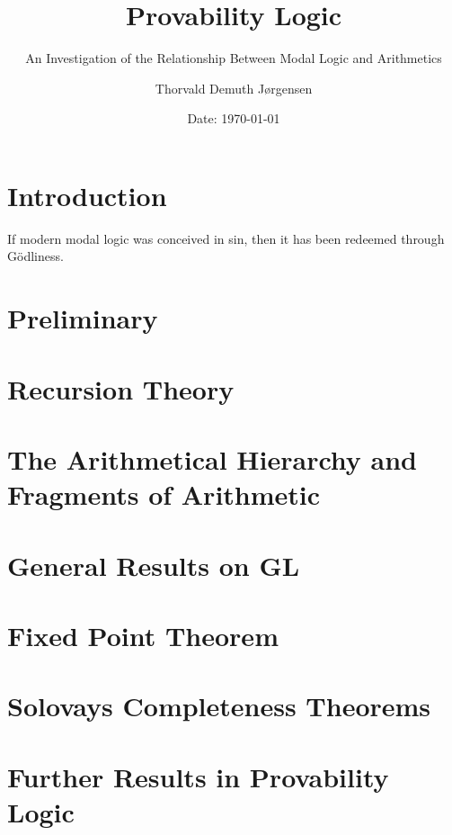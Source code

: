 \documentclass[12pt,a4paper,dvipsnames,bibliography=totocnumbered]{scrbook}
\author{Thorvald Demuth Jørgensen}
\title{Provability Logic}
\subtitle{An Investigation of the Relationship Between Modal Logic and
Arithmetics}
\date{Date: {\today}}
\theoremstyle{dotlessS}
\theoremstyle{dotlessS}
\theoremstyle{dotlessS}
\theoremstyle{dotlessS}
\theoremstyle{dotlessS}
\theoremstyle{dotlessS}
\theoremstyle{dotlessS}
\newcommand{\0}{\overline{0}}
\newcommand{\1}{\raisebox{\dimexpr1.79ex- \height}{$1$}}
\begin{document}
\maketitle
\tableofcontents
\newpage


\chapter{Introduction}
\epigraph{If modern modal logic was conceived in sin, then it has been redeemed
through Gödliness.}{\parencite[Page 1]{Boolos1979}}
\label{chap:intro}


\chapter{Preliminary}
\label{chap:Pre}


\chapter{Recursion Theory}
\label{chap:Recur}


\chapter{The Arithmetical Hierarchy and Fragments of Arithmetic}
\label{chap:PRA}


\chapter{General Results on GL}
\label{chap:GL}


\chapter{Fixed Point Theorem}
\label{chap:Fixed}


\chapter{Solovays Completeness Theorems}
\label{chap:Complete}


\chapter{Further Results in Provability Logic}
\label{chap:Further}


\nocite{*}
\printbibliography

\appendix

\end{document}
